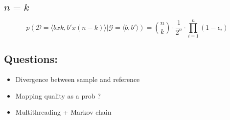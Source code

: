 \documentclass[a4paper,12pt]{article}
\begin{document}
\subsection{$n=k$}
\begin{equation}
p(\mathcal{D} = \langle bxk , b'x(n-k) \rangle| \mathcal{G} = \langle b,b' \rangle) = {n \choose k} \cdot \frac {1} {2^n} \cdot \prod_{i=1}^n (1-\epsilon_{i})
\end{equation}


\subsection{Questions:}


\begin{itemize}
\item Divergence between sample and reference 
\item Mapping quality as a prob ?
\item Multithreading + Markov chain
\end{itemize}
\end{document}
